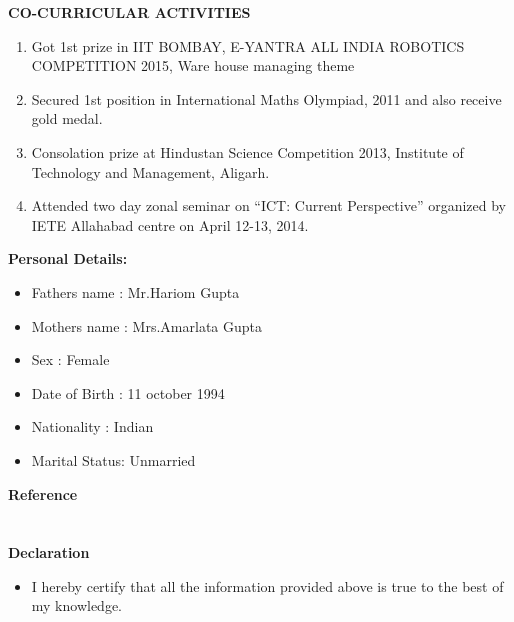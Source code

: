 \documentclass[10pt]{article}
\begin{document}
		\textbf{CO-CURRICULAR ACTIVITIES}\\
		\begin{enumerate}
	\item 	Got 1st prize in IIT BOMBAY, E-YANTRA ALL INDIA ROBOTICS COMPETITION 2015,
	Ware house managing theme 
	\item 	Secured 1st position in International Maths Olympiad, 2011 and also receive gold medal.
	\item 	Consolation prize at Hindustan Science Competition 2013, Institute of Technology and Management, Aligarh.
	\item 	Attended two day zonal seminar on “ICT: Current Perspective” organized by IETE Allahabad centre on April 12-13, 2014.
	
		\end{enumerate}
		\textbf{Personal Details:}\\
		\begin{itemize}
			\item Fathers name : Mr.Hariom Gupta
			\item Mothers name : Mrs.Amarlata Gupta
			\item Sex          : Female
			\item Date of Birth : 11 october 1994
			\item Nationality : Indian
			\item Marital Status: Unmarried
	    \end{itemize}
	    \textbf{Reference}\\ \\ \\
	    \textbf{Declaration}\\ 
	    \begin{itemize}
	    \item  I hereby certify that all the information provided above is true to the best of my knowledge.
	\end{itemize}
\end{document}
